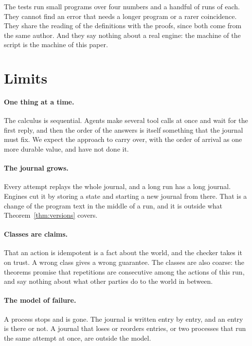 \documentclass[acmsmall,nonacm,screen]{acmart}
\begin{document}
The tests run small programs over four numbers and a handful of runs of each. They cannot
find an error that needs a longer program or a rarer coincidence. They share the reading of
the definitions with the proofs, since both come from the same author. And they say nothing
about a real engine: the machine of the script is the machine of this paper.

\section{Limits}
\label{sec:limits}

\paragraph{One thing at a time.} The calculus is sequential. Agents make several tool calls
at once and wait for the first reply, and then the order of the answers is itself something
that the journal must fix. We expect the approach to carry over, with the order of arrival as
one more durable value, and have not done it.

\paragraph{The journal grows.} Every attempt replays the whole journal, and a long run has a
long journal. Engines cut it by storing a state and starting a new journal from there. That is
a change of the program text in the middle of a run, and it is outside what
Theorem~\ref{thm:versions} covers.

\paragraph{Classes are claims.} That an action is idempotent is a fact about the world, and
the checker takes it on trust. A wrong class gives a wrong guarantee. The classes are also
coarse: the theorems promise that repetitions are consecutive among the actions of this run,
and say nothing about what other parties do to the world in between.

\paragraph{The model of failure.} A process stops and is gone. The journal is written entry
by entry, and an entry is there or not. A journal that loses or reorders entries, or two
processes that run the same attempt at once, are outside the model.
\end{document}
